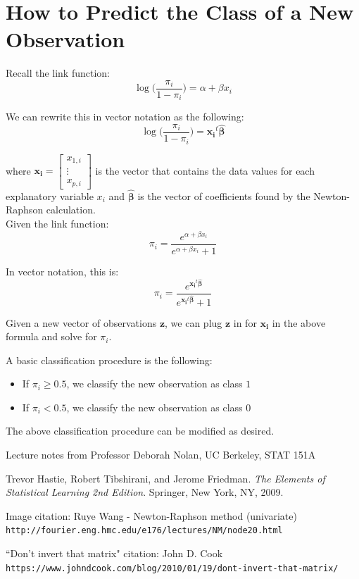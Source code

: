 \documentclass[12pt,timesnewroman,letterpaper]{article}
\begin{document}
\section{How to Predict the Class of a New Observation}

Recall the link function: 
$$
\log \big( \dfrac{\pi_i}{1-\pi_i} \big) = \alpha + \beta x_i
$$

\noindent We can rewrite this in vector notation as the following:
$$
\log \big( \dfrac{\pi_i}{1-\pi_i} \big) = \boldsymbol{x_i}^t \boldsymbol{\hat{\beta}}
$$

where $\boldsymbol{x_i} = \begin{bmatrix} 
    x_{1,i} \\
    \vdots \\
    x_{p,i}
    \end{bmatrix}$ is the vector that contains the data values for each explanatory variable $x_i$ and $\boldsymbol{\hat{\beta}}$ is the vector of coefficients found by the Newton-Raphson calculation.\\
    
\noindent Given the link function:
$$
\pi_i = \dfrac{e^{\alpha + \beta x_i}}{e^{\alpha + \beta x_i} + 1}
$$

\noindent In vector notation, this is:
$$
\pi_i = \dfrac{e^{\boldsymbol{x_i}^t \boldsymbol{\hat{\beta}}}}{e^{\boldsymbol{x_i}^t \boldsymbol{\hat{\beta}}} + 1}
$$

\noindent Given a new vector of observations $\boldsymbol{z}$, we can plug $\boldsymbol{z}$ in for $\boldsymbol{x_i}$ in the above formula and solve for $\pi_i$. 

A basic classification procedure is the following:

\begin{itemize}
    \item If $\pi_i \geq 0.5$, we classify the new observation as class $1$
    \item If $\pi_i < 0.5$, we classify the new observation as class $0$
\end{itemize}

\noindent The above classification procedure can be modified as desired.


\begin{thebibliography}{9}

Lecture notes from Professor Deborah Nolan, UC Berkeley, STAT 151A

Trevor Hastie, Robert Tibshirani, and Jerome Friedman. 
\textit{The Elements of Statistical Learning 2nd Edition}. 
Springer, New York, NY, 2009.

Image citation: Ruye Wang - Newton-Raphson method (univariate)
\\\texttt{http://fourier.eng.hmc.edu/e176/lectures/NM/node20.html}

``Don't invert that matrix" citation: John D. Cook
\\\texttt{https://www.johndcook.com/blog/2010/01/19/dont-invert-that-matrix/}
\end{thebibliography}
\end{document}
